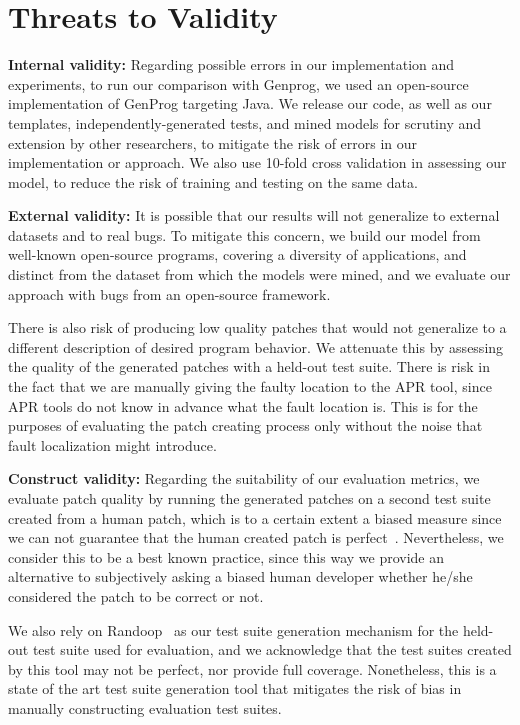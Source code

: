 \documentclass[conference]{IEEEtran}
\begin{document}
\section{Threats to Validity} \label{threatsVal}

\noindent\textbf{Internal validity:}
Regarding possible errors in our implementation and experiments, to run our
comparison with Genprog, we used an open-source implementation of GenProg
targeting Java. We release our code, as well as our templates,
independently-generated tests, and mined models for scrutiny and extension by other
researchers, to mitigate the risk of errors in our implementation or approach. 
 We also use 10-fold cross validation in
assessing our model, to reduce the risk of training and testing on the same
data.  

\noindent\textbf{External validity:} 
It is possible 
that our results will not generalize to external datasets and to
real bugs. To mitigate this concern, we build our model from well-known open-source
programs, covering a diversity of applications, and distinct from the dataset
from which the models were mined, and we evaluate our approach with bugs from an open-source framework.

There is also risk of producing low quality patches that would not 
generalize
to a different description of desired program behavior. We attenuate 
this by 
assessing the quality of the generated patches with a held-out test suite.
There is risk in the fact that we are manually giving the
faulty location to the APR tool, since APR tools do not know in advance what the 
fault location is. This is for the purposes of evaluating the patch creating 
process
only without the noise that fault localization might introduce.

\noindent\textbf{Construct validity:}
Regarding the suitability of our evaluation metrics, we evaluate patch
quality by running the generated patches on a second test suite created
from a human patch, which is to a certain extent a biased measure since we can
not guarantee that the human created patch is perfect~\cite{smith15}. Nevertheless, we consider 
this to be a
best known practice, since this way we provide an alternative to subjectively 
asking a biased human developer
whether he/she considered the patch to be correct or not. 

We also rely on Randoop~\cite{pacheco07} as our test suite generation mechanism 
for the held-out test suite used for evaluation, and we acknowledge that the 
test suites created by this tool may not be perfect, nor provide full coverage. 
Nonetheless, this is a state of the art test suite generation tool that mitigates the risk of bias in manually constructing evaluation test suites.
\end{document}
